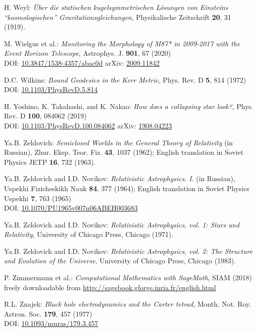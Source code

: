 \begin{thebibliography}{123}
H. Weyl: {\em \"Uber die statischen kugelsymmetrischen L\"osungen von Einsteins ``kosmologischen'' Gravitationsgleichungen},
Physikalische Zeitschrift {\bf 20}, 31 (1919).

M. Wielgus et al.:
{\em Monitoring the Morphology of M87* in 2009-2017 with the Event Horizon Telescope},
Astrophys. J. {\bf 901}, 67 (2020)\\
DOI: \href{https://doi.org/10.3847/1538-4357/abac0d}{10.3847/1538-4357/abac0d}\hfill
arXiv: \href{https://arxiv.org/abs/2009.11842}{2009.11842}

D.C. Wilkins:
{\em Bound Geodesics in the Kerr Metric},
Phys. Rev. D {\bf 5}, 814 (1972)\\
DOI: \href{https://doi.org/10.1103/PhysRevD.5.814}{10.1103/PhysRevD.5.814}

H. Yoshino, K. Takahashi, and K. Nakao:
{\em How does a collapsing star look?},
Phys. Rev. D {\bf 100}, 084062 (2019)\\
DOI: \href{https://doi-org.ezproxy.obspm.fr/10.1103/PhysRevD.100.084062}{10.1103/PhysRevD.100.084062}\hfill
arXiv: \href{https://arxiv.org/abs/1908.04223}{1908.04223}


Ya.B. Zeldovich:
{\em Semiclosed Worlds in the General Theory of Relativity} (in Russian),
Zhur. Eksp. Teor. Fiz. {\bf 43}, 1037 (1962); English translation in
Soviet Physics JETP {\bf 16}, 732 (1963).

Ya.B. Zeldovich and I.D. Novikov:
{\em Relativistic Astrophysics. I.} (in Russian),
Uspekhi Fizicheskikh Nauk {\bf 84}, 377 (1964);
English translation in Soviet Physics Uspekhi {\bf 7}, 763 (1965)\\
DOI: \href{https://doi.org/10.1070/PU1965v007n06ABEH003683}{10.1070/PU1965v007n06ABEH003683}

Ya.B. Zeldovich and I.D. Novikov:
{\em Relativistic Astrophysics, vol. 1: Stars and Relativity},
University of Chicago Press, Chicago (1971).

Ya.B. Zeldovich and I.D. Novikov:
{\em Relativistic Astrophysics, vol. 2: The Structure and Evolution of the Universe},
University of Chicago Press, Chicago (1983).

P. Zimmermann et al.: {\em Computational Mathematics with SageMath}, SIAM (2018) \\
freely downloadable from \url{http://sagebook.gforge.inria.fr/english.html}

R.L. Znajek:
{\em Black hole electrodynamics and the Carter tetrad},
Month. Not. Roy. Astron. Soc. {\bf 179}, 457 (1977)\\
DOI: \href{https://doi.org/10.1093/mnras/179.3.457}{10.1093/mnras/179.3.457}

\end{thebibliography}
